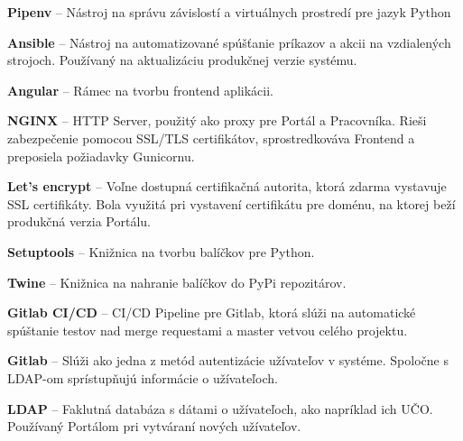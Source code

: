 \documentclass[
  digital, %
  oneside, %
  table,   %
  lof,     %
  lot,   %
]{fithesis3}
\begin{document}
\textbf{Pipenv} -- Nástroj na správu závislostí a virtuálnych prostredí pre jazyk Python

\textbf{Ansible} -- Nástroj na automatizované spúšťanie príkazov a akcii na vzdialených strojoch. Používaný na aktualizáciu produkčnej verzie systému.

\textbf{Angular} -- Rámec na tvorbu frontend aplikácii.

\textbf{NGINX} -- HTTP Server, použitý ako proxy pre Portál a Pracovníka. Rieši zabezpečenie pomocou SSL/TLS certifikátov, sprostredkováva Frontend a preposiela požiadavky Gunicornu.

\textbf{Let's encrypt} -- Voľne dostupná certifikačná autorita, ktorá zdarma vystavuje SSL certifikáty. Bola využitá pri vystavení certifikátu pre doménu, na ktorej beží produkčná verzia Portálu.

\textbf{Setuptools} -- Knižnica na tvorbu balíčkov pre Python.

\textbf{Twine} -- Knižnica na nahranie balíčkov do PyPi repozitárov.

\textbf{Gitlab CI/CD} -- CI/CD Pipeline pre Gitlab, ktorá slúži na automatické spúštanie testov nad merge requestami a master vetvou celého projektu.

\textbf{Gitlab} -- Slúži ako jedna z metód autentizácie užívateľov v systéme. Spoločne s LDAP-om sprístupňujú informácie o užívateľoch.

\textbf{LDAP} -- Faklutná databáza s dátami o užívateľoch, ako napríklad ich UČO. Používaný Portálom pri vytváraní nových užívateľov.
\end{document}
